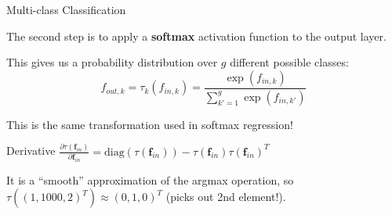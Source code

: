 \documentclass[11pt,compress,t,notes=noshow, xcolor=table]{beamer}
\begin{document}
\begin{framei} {Multi-class Classification}
    \item The second step is to apply a \textbf{softmax} activation function to the output layer.
    \vfill
    \item This gives us a probability distribution over $g$ different possible classes:
    $$ f_{out,k} = \tau_k(f_{in,k}) = \frac{\exp(f_{in,k})}{\sum_{k'=1}^g\exp(f_{in,k'})}$$
    \vfill
    \item This is the same transformation used in softmax regression!
    \vfill
    \item Derivative $ \frac{\partial \tau(\mathbf{f}_{in})}{\partial \mathbf{f}_{in}} = \text{diag}(\tau(\mathbf{f}_{in})) - \tau(\mathbf{f}_{in}) \tau(\mathbf{f}_{in})^T $
    \vfill
    \item It is a \enquote{smooth} approximation of the argmax operation,
        so $\tau((1, 1000, 2)^T) \approx (0, 1, 0)^T$ (picks out 2nd element!).
\end{framei}
\end{document}
